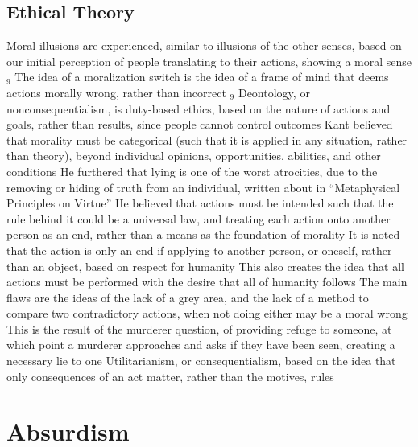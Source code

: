 \documentclass[11 pt, twoside]{article}
\newenvironment{outline*}
{
	\begin{outline}[enumerate]
	}
	{\end{outline}
}
\newcommand{\foota}[1]{\hyperlink{#1}{$_#1$}}
\begin{document}
\subsection{Ethical Theory}
\begin{outline*}
\1 Moral illusions are experienced, similar to illusions of the other senses, based on our initial perception of people translating to their actions, showing a moral sense \foota{9}
\1 The idea of a moralization switch is the idea of a frame of mind  that deems actions morally wrong, rather than incorrect \foota{9}
\1 Deontology, or nonconsequentialism, is duty-based ethics, based on the nature of actions and goals, rather than results, since people cannot control outcomes
\2 Kant believed that morality must be categorical (such that it is applied in any situation, rather than theory), beyond individual opinions, opportunities, abilities, and other conditions
\3 He furthered that lying is one of the worst atrocities, due to the removing or hiding of truth from an individual, written about in ``Metaphysical Principles on Virtue''
\2 He believed that actions must be intended such that the rule behind it could be a universal law, and treating each action onto another person as an end, rather than a means as the foundation of morality
\3 It is noted that the action is only an end if applying to another person, or oneself, rather than an object, based on respect for humanity
\3 This also creates the idea that all actions must be performed with the desire that all of humanity follows
\2 The main flaws are the ideas of the lack of a grey area, and the lack of a method to compare two contradictory actions, when not doing either may be a moral wrong
\3 This is the result of the murderer question, of providing refuge to someone, at which point a murderer approaches and asks if they have been seen, creating a necessary lie to one
\1 Utilitarianism, or consequentialism, based on the idea that only consequences of an act matter, rather than the motives, rules 
\end{outline*}
\section{Absurdism}
\end{document}
